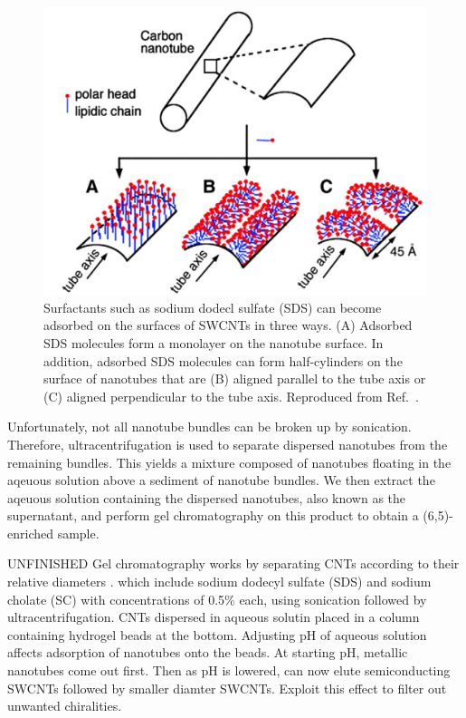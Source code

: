 \begin{figure}[h]
\centering
\includegraphics[scale=0.3]{images/chapter_methods/surfactant_tkalya}
\caption{Surfactants such as sodium dodecl sulfate (SDS) can become adsorbed on the surfaces of SWCNTs in three ways. (A) Adsorbed SDS molecules form a monolayer on the nanotube surface. In addition, adsorbed SDS molecules can form half-cylinders on the surface of nanotubes that are (B) aligned parallel to the tube axis or (C) aligned perpendicular to the tube axis. Reproduced from Ref.\ \cite{richard2003supramolecular}. }	
\label{fig:sds_molecule}
\end{figure}

Unfortunately, not all nanotube bundles can be broken up by sonication. Therefore, ultracentrifugation is used to separate dispersed nanotubes from the remaining bundles. This yields a mixture composed of nanotubes floating in the aqeuous solution above a sediment of nanotube bundles. We then extract the aqeuous solution containing the dispersed nanotubes, also known as the supernatant, and perform gel chromatography on this product to obtain a (6,5)-enriched sample.

{\color{red} UNFINISHED} Gel chromatography works by separating CNTs according to their relative diameters \cite{ichinose2017extraction}. which include sodium dodecyl sulfate (SDS) and sodium cholate (SC) with concentrations of 0.5\% each, using sonication followed by ultracentrifugation. CNTs dispersed in aqueous solutin placed in a column containing hydrogel beads at the bottom. Adjusting pH of aqueous solution affects adsorption of nanotubes onto the beads. At starting pH, metallic nanotubes come out first. Then as pH is lowered, can now elute semiconducting SWCNTs followed by smaller diamter SWCNTs. Exploit this effect to filter out unwanted chiralities. 

